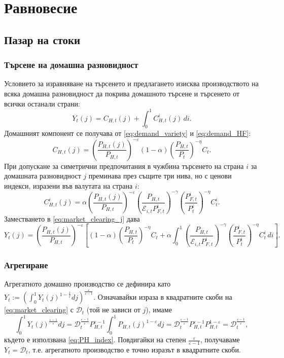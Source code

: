 \section{Равновесие}

\subsection{Пазар на стоки}

\subsubsection*{Търсене на домашна разновидност}

Условието за изравняване на търсенето и предлагането изисква производството на всяка домашна разновидност да покрива домашното търсене и търсенето от всички останали страни:
\begin{equation}
Y_t(j) = C_{H,t}(j) + \int_0^1 C^i_{H,t}(j)\, di.
\label{eq:market_clearing_j}
\end{equation}
Домашният компонент се получава от \eqref{eq:demand_variety} и \eqref{eq:demand_HF}:
\[
C_{H,t}(j) = \left( \frac{P_{H,t}(j)}{P_{H,t}} \right)^{-\varepsilon} (1-\alpha) \left( \frac{P_{H,t}}{P_t} \right)^{-\eta} C_t.
\]
При допускане за симетрични предпочитания в чужбина търсенето на страна $i$ за домашната разновидност $j$ преминава през същите три нива, но с ценови индекси, изразени във валутата на страна $i$:
\[
C^i_{H,t}(j) = \alpha \left( \frac{P_{H,t}(j)}{P_{H,t}} \right)^{-\varepsilon}
\left( \frac{P_{H,t}}{\mathcal{E}_{i,t} P^i_{F,t}} \right)^{-\gamma}
\left( \frac{P^i_{F,t}}{P^i_t} \right)^{-\eta} C^i_t.
\]
Заместването в \eqref{eq:market_clearing_j} дава
\begin{equation}
Y_t(j) = \left( \frac{P_{H,t}(j)}{P_{H,t}} \right)^{-\varepsilon}
\left[ (1-\alpha) \left( \frac{P_{H,t}}{P_t} \right)^{-\eta} C_t
+ \alpha \int_0^1 \left( \frac{P_{H,t}}{\mathcal{E}_{i,t} P^i_{F,t}} \right)^{-\gamma}
\left( \frac{P^i_{F,t}}{P^i_t} \right)^{-\eta} C^i_t\, di \right].
\label{eq:market_clearing}
\end{equation}

\subsubsection*{Агрегиране}

Агрегатното домашно производство се дефинира като
$Y_t := \left( \int_0^1 Y_t(j)^{1 - \frac{1}{\varepsilon}} dj \right)^{\frac{\varepsilon}{\varepsilon-1}}$.
Означавайки израза в квадратните скоби на \eqref{eq:market_clearing} с $\mathcal{D}_t$ (той не зависи от $j$), имаме
\[
\int_0^1 Y_t(j)^{\frac{\varepsilon-1}{\varepsilon}} dj
= \mathcal{D}_t^{\frac{\varepsilon-1}{\varepsilon}} P_{H,t}^{\varepsilon-1} \int_0^1 P_{H,t}(j)^{1-\varepsilon} dj
= \mathcal{D}_t^{\frac{\varepsilon-1}{\varepsilon}} P_{H,t}^{\varepsilon-1} P_{H,t}^{1-\varepsilon}
= \mathcal{D}_t^{\frac{\varepsilon-1}{\varepsilon}},
\]
където е използвана \eqref{eq:PH_index}. Повдигайки на степен $\frac{\varepsilon}{\varepsilon-1}$, получаваме $Y_t = \mathcal{D}_t$, т.е. агрегатното производство е точно изразът в квадратните скоби.

